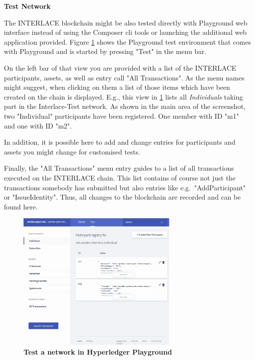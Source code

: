 \textbf{Test Network}

The INTERLACE blockchain might be also tested directly with Playground web interface instead of using the Composer cli tools or launching the additional web application provided. Figure \ref{fig:test-network} shows the Playground test environment that comes with Playground and is started by pressing "Test" in the menu bar.

On the left bar of that view you are provided with a list of the INTERLACE participants, assets, as well as entry call "All Transactions". As the menu names might suggest, when clicking on them a list of those items which have been created on the chain is displayed. E.g., this view in \ref{fig:test-network} lists all \textit{Individuals} taking part in the Interlace-Test network. As shown in the main area of the screenshot, two "Individual" participants have been registered. One member with ID "m1" and one with ID "m2".

In addition, it is possible here to add and change entries for participants and assets you might change for customised tests.

Finally, the "All Transactions" menu entry guides to a list of all transactions executed on the INTERLACE chain. This list contains of course not just the transactions somebody has submitted but also entries like e.g.\ "AddParticipant" or "IssueIdentity". Thus, all changes to the blockchain are recorded and can be found here.

\begin{figure}[htbp]
  \centering
  \includegraphics[width=0.7\textwidth]{Figures/test-network}
  \caption{\bf\small Test a network in Hyperledger Playground}
  \label{fig:test-network}
\end{figure}

